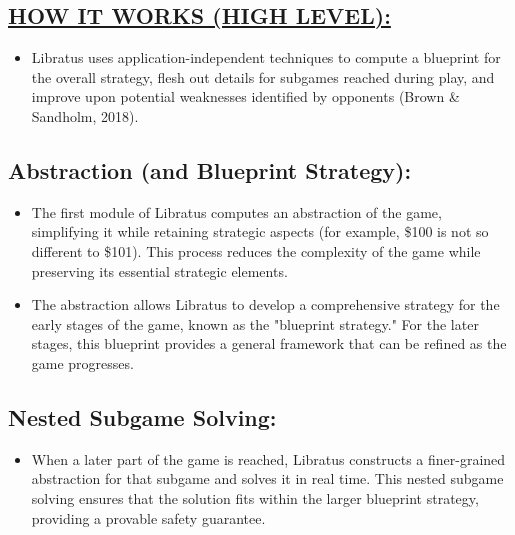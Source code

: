 \documentclass[
]{article}
\begin{document}
\subsection*{\texorpdfstring{\textbf{\ul{HOW IT WORKS (HIGH
LEVEL):}}}{HOW IT WORKS (HIGH LEVEL):}}\label{how-it-works-high-level}

\begin{itemize}
\item
  Libratus uses application-independent techniques to compute a
  blueprint for the overall strategy, flesh out details for subgames
  reached during play, and improve upon potential weaknesses identified
  by opponents (Brown \& Sandholm, 2018).
\end{itemize}

\subsection{Abstraction (and Blueprint
Strategy):}\label{abstraction-and-blueprint-strategy}

\begin{itemize}
\item
  The first module of Libratus computes an abstraction of the game,
  simplifying it while retaining strategic aspects (for example, \$100
  is not so different to \$101). This process reduces the complexity of
  the game while preserving its essential strategic elements.
\item
  The abstraction allows Libratus to develop a comprehensive strategy
  for the early stages of the game, known as the "blueprint strategy."
  For the later stages, this blueprint provides a general framework that
  can be refined as the game progresses.
\end{itemize}

\subsection{Nested Subgame Solving:}\label{nested-subgame-solving}

\begin{itemize}
\item
  When a later part of the game is reached, Libratus constructs a
  finer-grained abstraction for that subgame and solves it in real time.
  This nested subgame solving ensures that the solution fits within the
  larger blueprint strategy, providing a provable safety guarantee.
\end{itemize}
\end{document}
